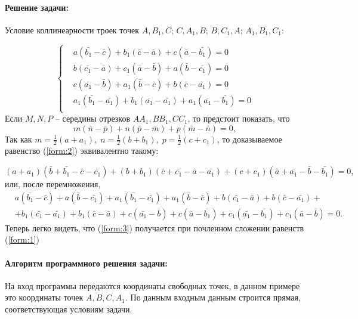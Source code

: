 \documentclass[oneside,final,14pt]{extreport}
\begin{document}
\paragraph{Решение задачи:}
Условие коллинеарности троек точек \(A, B_1 , C\); \(C,
A_1 , B\); \(B, C_1 , A\); \(A_1 , B_1 , C_1\):

\begin{equation}
    \left\{ \begin{aligned}
         & a(\bar{b_1} - \bar{c}) + b_1(\bar{c} - \bar{a}) + c(\bar{a} - \bar{b_1}) = 0             \\
         & b(\bar{c_1} - \bar{a}) + c_1(\bar{a} - \bar{b}) + a(\bar{b} - \bar{c_1}) = 0             \\
         & c(\bar{a_1} - \bar{b}) + a_1(\bar{b} - \bar{c}) + b(\bar{c} - \bar{a_1}) = 0             \\
         & a_1(\bar{b_1} - \bar{a_1}) + b_1(\bar{a_1} - \bar{a_1}) + a_1(\bar{a_1} - \bar{b_1}) = 0 \\
    \end{aligned}
    \right. \label{form:1}
\end{equation}
Если \(M, N, P\) -- середины отрезков \(AA_1, BB_1, CC_1\), то предстоит показать, что
\begin{equation}
    m(\bar{n} -\bar{p})+n(\bar{p}-\bar{m})+p(\bar{m}-\bar{n})=0,
    \label{form:2}
\end{equation}
Так как \(\displaystyle
    m=\frac{1}{2}(a+a_1),\;
    n=\frac{1}{2}(b+b_1),\;
    p=\frac{1}{2}(c+c_1)
\), то доказываемое равенство (\ref{form:2}) эквивалентно такому:

\(
(a+a_1)(\bar{b}+\bar{b_1}-\bar{c}-\bar{c_1})+(b+b_1 )(\bar{c}+\bar{c_1}-\bar{a}-\bar{a_1})+(c+c_1)(\bar{a}+\bar{a_1}-\bar{b}-\bar{b_1})=0,
\) или, после перемножения,
\begin{equation}
    \begin{aligned}
            &a(\bar{b_1} - \bar{c}) + a(\bar{b}- \bar{c_1}) + a_1(\bar{b_1} - \bar{c_1}) + a_1(\bar{b}- \bar{c}) + b(\bar{c_1} - \bar{a}) + b(\bar{c}- \bar{a_1}) +\\
            &+b_1(\bar{c_1}-\bar{a_1})+b_1 (\bar{c}-\bar{a})+c(\bar{a_1}-\bar{b})+c(\bar{a}-\bar{b_1})+c_1 (\bar{a_1}-\bar{b_1} )+c_1(\bar{a}-\bar{b})=0.
    \end{aligned}
    \label{form:3}
\end{equation}
Теперь легко видеть, что (\ref{form:3}) получается при почленном сложении
равенств (\ref{form:1})
\paragraph*{Алгоритм программного решения задачи:} На вход программы передаются координаты свободных точек, в данном примере это координаты точек \(A,B,C,A_1\). По данным входным данным строится прямая, соответствующая условиям задачи.


\end{document}

